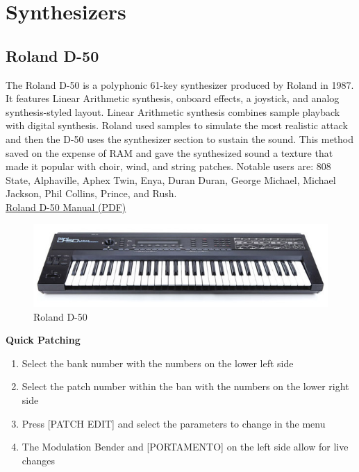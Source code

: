 \section{Synthesizers}

\subsection{Roland D-50}
The Roland D-50 is a polyphonic 61-key synthesizer produced by Roland in 1987. It features Linear Arithmetic synthesis, onboard effects, a joystick, and analog synthesis-styled layout. Linear Arithmetic synthesis combines sample playback with digital synthesis. Roland used samples to simulate the most realistic attack and then the D-50 uses the synthesizer section to sustain the sound. This method saved on the expense of RAM and gave the synthesized sound a texture that made it popular with choir, wind, and string patches. Notable users are: 808 State, Alphaville, Aphex Twin, Enya, Duran Duran, George Michael, Michael Jackson, Phil Collins, Prince, and Rush. \\
\linebreak
\href{https://github.com/dkadyrov/MIDILab/blob/master/Manuals/Roland_D50.pdf}{Roland D-50 Manual (PDF)}

\begin{figure}[h]
\centering
\includegraphics[width=.85\textwidth]{Images/roland_d50.jpg}
\caption{Roland D-50}
\label{fig:fullfig}
\end{figure}

\textbf{Quick Patching}
\begin{enumerate}
	\item Select the bank number with the numbers on the lower left side
	\item Select the patch number within the ban with the numbers on the lower right side
	\item Press [PATCH EDIT] and select the parameters to change in the menu
	\item The Modulation Bender and [PORTAMENTO] on the left side allow for live changes
\end{enumerate}

\newpage
